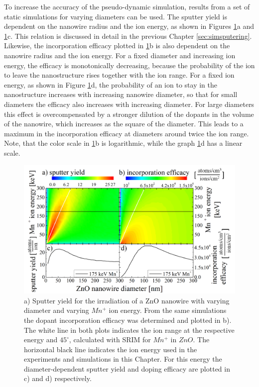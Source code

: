 To increase the accuracy of the pseudo-dynamic simulation, results from a set of static simulations for varying diameters can be used. The sputter yield is dependent on the nanowire radius and the ion energy, as shown in Figures \ref{sputterincorporate}a and \ref{sputterincorporate}c. This relation is discussed in detail in the previous Chapter \ref{sec:simsputering}. Likewise, the incorporation efficacy plotted in \ref{sputterincorporate}b is also dependent on the nanowire radius and the ion energy. For a fixed diameter and increasing ion energy, the efficacy is monotonically decreasing, because the probability of the ion to leave the nanostructure rises together with the ion range. For a fixed ion energy, as shown in Figure \ref{sputterincorporate}d, the probability of an ion to stay in the nanostructure increases with increasing nanowire diameter, so that for small diameters the efficacy also increases with increasing diameter. For large diameters this effect is overcompensated by a stronger dilution of the dopants in the volume of the nanowire, which increases as the square of the diameter. This leads to a maximum in the incorporation efficacy at diameters around twice the ion range. Note, that the color scale in \ref{sputterincorporate}b is logarithmic, while the graph \ref{sputterincorporate}d has a linear scale.


\begin{figure}[t]
	\centering
		\includegraphics[width=.8\textwidth]{images/sputterincorporate.png}
	\caption{a) Sputter yield for the irradiation of a ZnO nanowire with varying diameter and varying $Mn^+$ ion energy. From the same simulations the dopant incorporation efficacy was determined and plotted in b). The white line in both plots indicates the ion range at the respective energy and $45^\circ$, calculated with SRIM for $Mn^+$ in $ZnO$. The horizontal black line indicates the ion energy used in the experiments and simulations in this Chapter. For this energy the diameter-dependent sputter yield and doping efficacy are plotted in c) and d) respectively.}
	\label{sputterincorporate}
\end{figure} 

